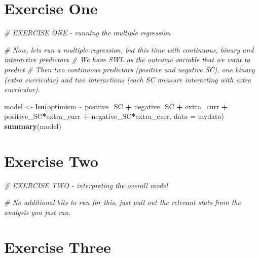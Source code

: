 \documentclass[
]{book}
\newenvironment{Shaded}{\begin{snugshade}}{\end{snugshade}}
\newcommand{\AttributeTok}[1]{\textcolor[rgb]{0.13,0.29,0.53}{#1}}
\newcommand{\CommentTok}[1]{\textcolor[rgb]{0.56,0.35,0.01}{\textit{#1}}}
\newcommand{\FunctionTok}[1]{\textcolor[rgb]{0.13,0.29,0.53}{\textbf{#1}}}
\newcommand{\NormalTok}[1]{#1}
\newcommand{\OtherTok}[1]{\textcolor[rgb]{0.56,0.35,0.01}{#1}}
\newcommand{\SpecialCharTok}[1]{\textcolor[rgb]{0.81,0.36,0.00}{\textbf{#1}}}
\let\oldsection\section
\renewcommand{\section}{\needspace{5\baselineskip}\oldsection}
\begin{document}
\section{\texorpdfstring{\textbf{Exercise One}}{Exercise One}}\label{exercise-one-2}

\begin{Shaded}
\begin{Highlighting}[]
\CommentTok{\# EXERCISE ONE {-} running the multiple regression}

\CommentTok{\# Now, let\textquotesingle{}s run a multiple regression, but this time with continuous, binary and interactive predictors}
\CommentTok{\# We have SWL as the outcome variable that we want to predict}
\CommentTok{\# Then two continuous predictors (positive and negative SC), one binary (extra curricular) and two interactions (each SC measure interacting with extra curricular).}

\NormalTok{model }\OtherTok{\textless{}{-}} \FunctionTok{lm}\NormalTok{(optimism }\SpecialCharTok{\textasciitilde{}}\NormalTok{ positive\_SC }\SpecialCharTok{+}\NormalTok{ negative\_SC }\SpecialCharTok{+}\NormalTok{ extra\_curr }\SpecialCharTok{+}\NormalTok{ positive\_SC}\SpecialCharTok{*}\NormalTok{extra\_curr }\SpecialCharTok{+}\NormalTok{ negative\_SC}\SpecialCharTok{*}\NormalTok{extra\_curr, }\AttributeTok{data =}\NormalTok{ mydata)}
\FunctionTok{summary}\NormalTok{(model)}
\end{Highlighting}
\end{Shaded}

\section{\texorpdfstring{\textbf{Exercise Two}}{Exercise Two}}\label{exercise-two-3}

\begin{Shaded}
\begin{Highlighting}[]
\CommentTok{\# EXERCISE TWO {-} interpreting the overall model}

\CommentTok{\# No additional bits to run for this, just pull out the relevant stats from the analysis you just ran.}
\end{Highlighting}
\end{Shaded}

\section{\texorpdfstring{\textbf{Exercise Three}}{Exercise Three}}\label{exercise-three-3}
\end{document}
